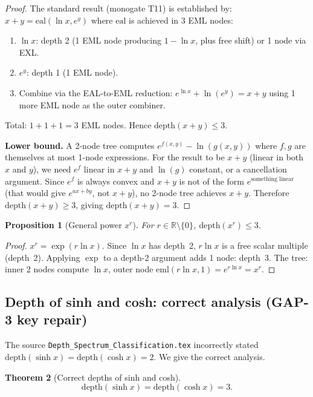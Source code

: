 \documentclass[12pt,a4paper]{article}
\newtheorem{theorem}{Theorem}[section]
\newtheorem{proposition}[theorem]{Proposition}
\theoremstyle{definition}
\theoremstyle{remark}
\begin{document}
\begin{proof}
\medskip
The standard result (monogate T11) is established by:
$x + y = \mathrm{eal}(\ln x, e^y)$ where $\mathrm{eal}$ is achieved in 3 EML nodes:
\begin{enumerate}
  \item $\ln x$: depth 2 (1 EML node producing $1-\ln x$, plus free shift) or 1 node via EXL.
  \item $e^y$: depth 1 (1 EML node).
  \item Combine via the EAL-to-EML reduction: $e^{\ln x} + \ln(e^y) = x + y$
        using 1 more EML node as the outer combiner.
\end{enumerate}
Total: $1 + 1 + 1 = 3$ EML nodes.  Hence $\mathrm{depth}(x+y) \leq 3$.

\textbf{Lower bound.}
A 2-node tree computes $e^{f(x,y)} - \ln(g(x,y))$ where $f, g$ are themselves
at most 1-node expressions.  For the result to be $x+y$ (linear in both $x$ and $y$),
we need $e^{f}$ linear in $x+y$ and $\ln(g)$ constant, or a cancellation argument.
Since $e^{f}$ is always convex and $x+y$ is not of the form $e^{\text{something linear}}$
(that would give $e^{ax+by}$, not $x+y$), no 2-node tree achieves $x+y$.
Therefore $\mathrm{depth}(x+y) \geq 3$, giving $\mathrm{depth}(x+y) = 3$.
\end{proof}

\begin{proposition}[General power $x^r$]\label{prop:power}
For $r \in \mathbb{R} \setminus \{0\}$, $\mathrm{depth}(x^r) \leq 3$.
\end{proposition}
\begin{proof}
$x^r = \exp(r \ln x)$.  Since $\ln x$ has depth~2, $r \ln x$ is a free scalar
multiple (depth~2).  Applying $\exp$ to a depth-2 argument adds 1 node: depth~3.
The tree: inner 2 nodes compute $\ln x$, outer node $\mathrm{eml}(r \ln x, 1) = e^{r\ln x} = x^r$.
\end{proof}

\subsection{Depth of sinh and cosh: correct analysis (GAP-3 key repair)}

The source \texttt{Depth\_Spectrum\_Classification.tex} incorrectly stated
$\mathrm{depth}(\sinh x) = \mathrm{depth}(\cosh x) = 2$.  We give the correct analysis.

\begin{theorem}[Correct depths of sinh and cosh]\label{thm:sinhcosh}
\[
  \mathrm{depth}(\sinh x) = \mathrm{depth}(\cosh x) = 3.
\]
\end{theorem}
\end{document}
